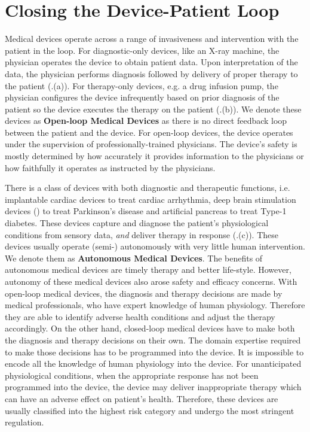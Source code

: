 \section{Closing the Device-Patient Loop}
Medical devices operate across a range of invasiveness and intervention with the patient in the loop. 
For diagnostic-only devices, like an X-ray machine, the physician operates the device to obtain patient data. 
Upon interpretation of the data, the physician performs diagnosis followed by delivery of proper therapy to the patient (.(a)). 
For therapy-only devices, e.g. a drug infusion pump, the physician configures the device infrequently based on prior diagnosis of the patient so the device executes the therapy on the patient (.(b)). 
We denote these devices as \textbf{Open-loop Medical Devices} as there is no direct feedback loop between the patient and the device. 
For open-loop devices, the device operates under the supervision of professionally-trained physicians. 
The device's safety is mostly determined by how accurately it provides information to the physicians or how faithfully it operates as instructed by the physicians.

There is a class of devices with both diagnostic and therapeutic functions, i.e. implantable cardiac devices to treat cardiac arrhythmia, deep brain stimulation devices (\cite{Brain_sti}) to treat Parkinson's disease and artificial pancreas to treat Type-1 diabetes. 
These devices capture and diagnose the patient's physiological conditions from sensory data, \emph{and} deliver therapy in response (.(c)). These devices usually operate (semi-) autonomously with very little human intervention. 
We denote them as \textbf{Autonomous Medical Devices}. 
The benefits of autonomous medical devices are timely therapy and better life-style.
However, autonomy of these medical devices also arose safety and efficacy concerns. 
With open-loop medical devices, the diagnosis and therapy decisions are made by medical professionals, who have expert knowledge of human physiology. Therefore they are able to identify adverse health conditions and adjust the therapy accordingly. 
On the other hand, closed-loop medical devices have to make both the diagnosis and therapy decisions on their own. 
The domain expertise required to make those decisions has to be programmed into the device. 
It is impossible to encode all the knowledge of human physiology into the device. 
For unanticipated physiological conditions, when the appropriate response has not been programmed into the device, the device may deliver inappropriate therapy which can have an adverse effect on patient's health. 
Therefore, these devices are usually classified into the highest risk category and undergo the most stringent regulation. 
